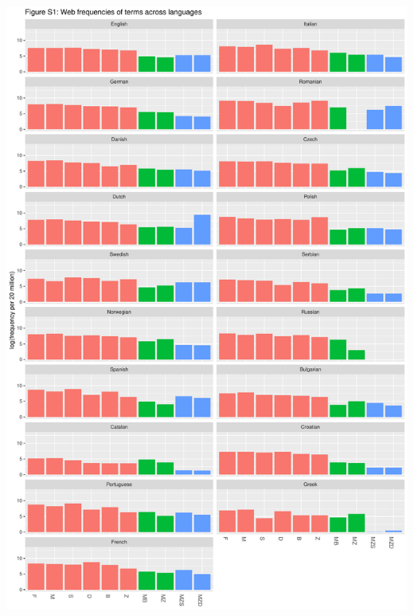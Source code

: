 \documentclass[]{article}
\begin{document}
\begin{center}\includegraphics{figures/unnamed-chunk-6-1} \end{center}
\end{document}
